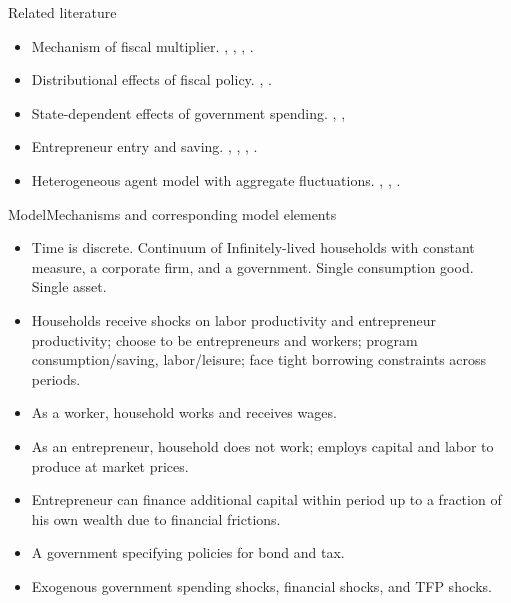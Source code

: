 \documentclass[svgnames]{beamer}
\begin{document}
\begin{frame}{Related literature}
\begin{itemize}
\item {\color{blue} Mechanism of fiscal multiplier.} \citet{hall_by_2009}, \citet{dyrda_models_2012}, \citet{woodford_simple_2010}, \citet{uhlig_fiscal_2010}.

\item {\color{blue} Distributional effects of fiscal policy.} \citet{heathcote_fiscal_2005}, \citet{bachmann_welfare_2013}.

\item {\color{blue} State-dependent effects of government spending.} \citet{auerbach_measuring_2012}, \citet{owyang_are_2013}, \citet{fazzari_state-dependent_2015}

\item {\color{blue} Entrepreneur entry and saving.} \citet{decker_role_2014}, \citet{quadrini_entrepreneurship_2000}, \citet{cagetti_entrepreneurship_2006}, \citet{buera_financial_2013}.

\item {\color{blue} Heterogeneous agent model with aggregate fluctuations.}
\citet{krusell_income_1997}, \citet{reiter_solving_2009}, \citet{winberry_lumpy_2014}.

\end{itemize}
\end{frame}

\begin{frame}{Model}{Mechanisms and corresponding model elements}
\begin{itemize}
\item Time is discrete. Continuum of Infinitely-lived households with constant measure, a corporate firm, and a government. Single consumption good. Single asset.
\item Households receive shocks on labor productivity and entrepreneur productivity; {\color{blue}choose} to be entrepreneurs and workers; program {\color{blue}consumption/saving}, {\color{blue}labor/leisure}; face tight borrowing constraints across periods.
\item As a worker, household works and receives wages.
\item As an entrepreneur, household does not work; employs capital and labor to produce at market prices.
\item Entrepreneur can finance additional capital within period {\color{blue}up to} a fraction of his own wealth due to financial frictions.
\item A government specifying policies for {\color{blue}bond and tax}.
\item Exogenous government spending shocks, financial shocks, and TFP shocks.
\end{itemize}
\end{frame}
\end{document}
